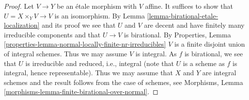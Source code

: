 \documentclass{stacks-project}
\theoremstyle{plain}
\theoremstyle{definition}
\theoremstyle{remark}
\numberwithin{equation}{subsection}
\begin{document}
\begin{proof}
Let $V \to Y$ be an \'etale morphism with $V$ affine. It suffices to show that
$U = X \times_Y V \to V$ is an isomorphism. By
Lemma \ref{lemma-birational-etale-localization} and its proof
we see that $U$ and $V$ are decent and have finitely many
irreducible components and that $U \to V$ is birational.
By Properties, Lemma
\ref{properties-lemma-normal-locally-finite-nr-irreducibles}
$V$ is a finite disjoint union of integral schemes.
Thus we may assume $V$ is integral. As $f$ is birational, we
see that $U$ is irreducible and reduced, i.e., integral
(note that $U$ is a scheme as $f$ is integral, hence representable).
Thus we may assume that $X$ and $Y$ are integral schemes
and the result follows from the case of schemes, see
Morphisms, Lemma \ref{morphisms-lemma-finite-birational-over-normal}.
\end{proof}
\end{document}
